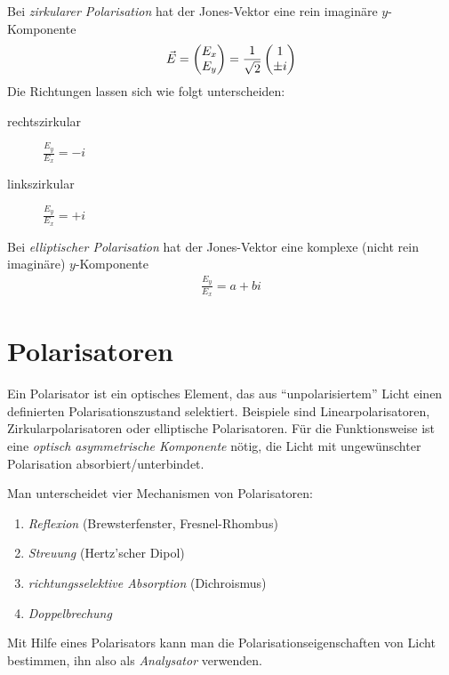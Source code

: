 Bei \emph{zirkularer Polarisation}
hat der Jones-Vektor eine rein imaginäre
$y$-Komponente
\begin{gather*}
  \vec{E} = \begin{pmatrix}E_x\\E_y\end{pmatrix} 
  = \frac{1}{\sqrt{2}}\begin{pmatrix}1\\\pm i\end{pmatrix}
\end{gather*}
Die Richtungen lassen sich wie folgt unterscheiden:
\begin{description}
\item[rechtszirkular] $\frac{E_y}{E_x}=-i$
\item[linkszirkular] $\frac{E_y}{E_x}=+i$
\end{description}

Bei \emph{elliptischer Polarisation}
hat der Jones-Vektor eine komplexe (nicht rein imaginäre)
$y$-Komponente
\begin{gather*}
  \frac{E_y}{E_x} = a+bi
\end{gather*}


\section{Polarisatoren}
Ein Polarisator ist ein optisches Element,
das aus \enquote{unpolarisiertem} Licht einen definierten
Polarisationszustand selektiert.
Beispiele sind Linearpolarisatoren, Zirkularpolarisatoren oder
elliptische Polarisatoren.
Für die Funktionsweise ist eine \emph{optisch asymmetrische
  Komponente} nötig,
die Licht mit ungewünschter Polarisation absorbiert/unterbindet.

Man unterscheidet vier Mechanismen von Polarisatoren:
\begin{enumerate}
\item \emph{Reflexion} (Brewsterfenster, Fresnel-Rhombus)
\item \emph{Streuung} (Hertz'scher Dipol)
\item \emph{richtungsselektive Absorption} (Dichroismus)
\item \emph{Doppelbrechung}
\end{enumerate}

Mit Hilfe eines Polarisators kann man die Polarisationseigenschaften
von Licht bestimmen, ihn also als \emph{Analysator}
verwenden.

